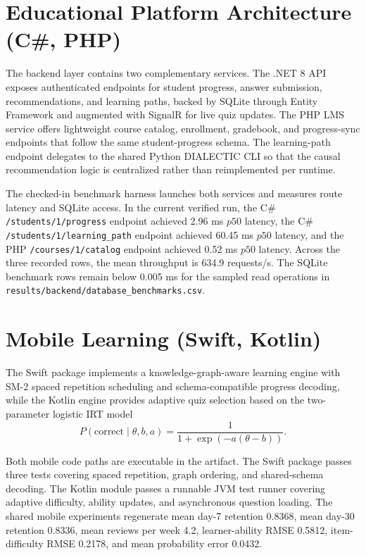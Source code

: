 \documentclass[conference]{IEEEtran}
\begin{document}
\section{Educational Platform Architecture (C\#, PHP)}
The backend layer contains two complementary services. The .NET 8 API exposes authenticated endpoints for student progress, answer submission, recommendations, and learning paths, backed by SQLite through Entity Framework and augmented with SignalR for live quiz updates. The PHP LMS service offers lightweight course catalog, enrollment, gradebook, and progress-sync endpoints that follow the same student-progress schema. The learning-path endpoint delegates to the shared Python DIALECTIC CLI so that the causal recommendation logic is centralized rather than reimplemented per runtime.

The checked-in benchmark harness launches both services and measures route latency and SQLite access. In the current verified run, the C\# \texttt{/students/1/progress} endpoint achieved 2.96 ms $p50$ latency, the C\# \texttt{/students/1/learning\_path} endpoint achieved 60.45 ms $p50$ latency, and the PHP \texttt{/courses/1/catalog} endpoint achieved 0.52 ms $p50$ latency. Across the three recorded rows, the mean throughput is 634.9 requests/s. The SQLite benchmark rows remain below 0.005 ms for the sampled read operations in \texttt{results/backend/database\_benchmarks.csv}.

\section{Mobile Learning (Swift, Kotlin)}
The Swift package implements a knowledge-graph-aware learning engine with SM-2 spaced repetition scheduling and schema-compatible progress decoding, while the Kotlin engine provides adaptive quiz selection based on the two-parameter logistic IRT model
\begin{equation}
P(\text{correct}\mid \theta, b, a)=\frac{1}{1+\exp(-a(\theta-b))}.
\end{equation}

Both mobile code paths are executable in the artifact. The Swift package passes three tests covering spaced repetition, graph ordering, and shared-schema decoding. The Kotlin module passes a runnable JVM test runner covering adaptive difficulty, ability updates, and asynchronous question loading. The shared mobile experiments regenerate mean day-7 retention 0.8368, mean day-30 retention 0.8336, mean reviews per week 4.2, learner-ability RMSE 0.5812, item-difficulty RMSE 0.2178, and mean probability error 0.0432.
\end{document}
